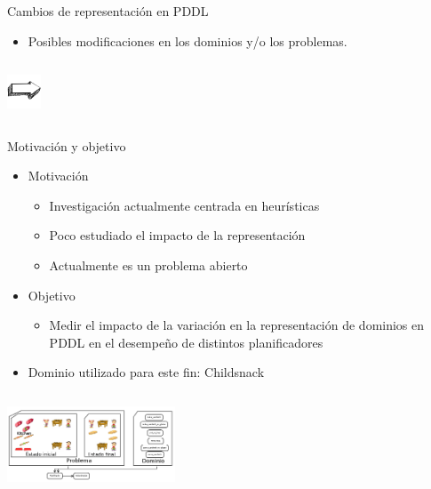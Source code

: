 \documentclass[xcolor=table]{beamer}
\begin{document}
\begin{frame}{Cambios de representación en PDDL}
    \begin{itemize}
        \item Posibles modificaciones en los dominios y/o los problemas.
    \end{itemize}

    \begin{columns}
    \parbox{2in}{\shadowbox{
    
    }}
    
    \begin{flushright}
    \includegraphics[width=1cm,height=1cm]{arrow}
    \end{flushright}
    
    \parbox{2in}{\shadowbox{
        
        }}
    \end{columns}
    
\end{frame}


\begin{frame}{Motivación y objetivo}
    \begin{itemize}
        \item Motivación
        \begin{itemize}
            \item Investigación actualmente centrada en heurísticas
            \item Poco estudiado el impacto de la representación
            \item Actualmente es un problema abierto
        \end{itemize}
        \item Objetivo
        \begin{itemize}
            \item Medir el impacto de la variación en la representación de dominios en PDDL en el desempeño de distintos planificadores
        \end{itemize}
        \item Dominio utilizado para este fin: Childsnack
    \end{itemize}
    \begin{center}
        \includegraphics[width=5cm,height=3cm]{childSnack2}
    \end{center}
\end{frame}
\end{document}
